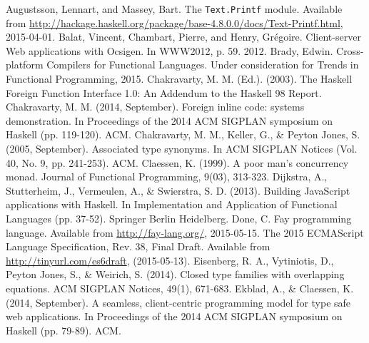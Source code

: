 \documentclass[preprint]{sigplanconf}
\begin{document}
\begin{thebibliography}{}
\softraggedright

  Augustsson, Lennart, and Massey, Bart. The {\tt Text.Printf} module.
  Available from \url{http://hackage.haskell.org/package/base-4.8.0.0/docs/Text-Printf.html},
  2015-04-01.
  Balat, Vincent, Chambart, Pierre, and Henry, Grégoire.
  Client-server Web applications with Ocsigen.
  In WWW2012, p. 59. 2012.
  Brady, Edwin.
  Cross-platform Compilers for Functional Languages.
  Under consideration for Trends in Functional Programming, 2015.
  Chakravarty, M. M. (Ed.). (2003).
  The Haskell Foreign Function Interface 1.0: An Addendum to the Haskell 98
  Report.
  Chakravarty, M. M. (2014, September).
  Foreign inline code: systems demonstration.
  In Proceedings of the 2014 ACM SIGPLAN symposium on Haskell (pp. 119-120).
  ACM.
  Chakravarty, M. M., Keller, G., \& Peyton Jones, S. (2005, September).
  Associated type synonyms.
  In ACM SIGPLAN Notices (Vol. 40, No. 9, pp. 241-253). ACM.
  Claessen, K. (1999).
  A poor man's concurrency monad.
  Journal of Functional Programming, 9(03), 313-323.
  Dijkstra, A., Stutterheim, J., Vermeulen, A., \& Swierstra, S. D. (2013).
  Building JavaScript applications with Haskell.
  In Implementation and Application of Functional Languages (pp. 37-52).
  Springer Berlin Heidelberg.
  Done, C.
  Fay programming language.
  Available from \url{http://fay-lang.org/}, 2015-05-15.
  The 2015 ECMAScript Language Specification, Rev. 38, Final Draft.
  Available from \url{http://tinyurl.com/es6draft},
  (2015-05-13).
  Eisenberg, R. A., Vytiniotis, D., Peyton Jones, S., \& Weirich, S. (2014).
  Closed type families with overlapping equations.
  ACM SIGPLAN Notices, 49(1), 671-683.
  Ekblad, A., \& Claessen, K. (2014, September).
  A seamless, client-centric programming model for type safe web applications.
  In Proceedings of the 2014 ACM SIGPLAN symposium on Haskell (pp. 79-89). ACM.

\end{thebibliography}
\end{document}
